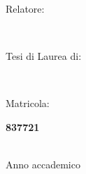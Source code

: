 \begin{multicols}{2}

	\begin{minipage}[t]{0.5\textwidth}
		
		\fontsize{0.6cm}{0.72em}\begin{addmargin}[0em]{1em}\textnormal{Relatore:\\} \end{addmargin}
		
		\fontsize{0.6cm}{0.72em}\begin{addmargin}[0em]{1em}\textbf{\myProf \\[0.5cm]} \end{addmargin}
			

			
	\end{minipage}

\columnbreak

	\begin{minipage}[t]{0.5\textwidth}
	
		\fontsize{0.6cm}{0.72em}\begin{addmargin}[4em]{1em}\textnormal{Tesi di Laurea di:\\} \end{addmargin}
		
		
		\fontsize{0.6cm}{0.72em}\begin{addmargin}[4em]{1em}\textbf{\myName\\} \end{addmargin}
		
			\fontsize{0.6cm}{0.72em}\begin{addmargin}[4em]{1em}\textnormal{Matricola:\\} \end{addmargin}
		
		
		\fontsize{0.6cm}{0.72em}\begin{addmargin}[4em]{1em}\textbf{837721} \end{addmargin}
		
	\end{minipage}
	
\end{multicols}


\begin {center}
{	
	\text{}\\[2cm]
	\fontsize{0.6cm}{1em}\textnormal{Anno accademico \myAcademicYear}
}
\end{center}

%
